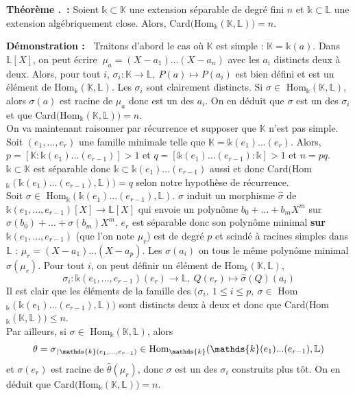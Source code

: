 \documentclass[5pt,a4paper]{article}
\newcounter{thmcounter}[subsection]
\renewcommand{\thethmcounter}{\thesubsection.\arabic{thmcounter}}
\newcommand{\thm}[1]{
    \stepcounter{thmcounter}
    \hypertarget{t:\thethmcounter}{}%
    \noindent\textbf{Théorème \thethmcounter ~:} #1 \newline
}
\newcommand{\demo}[1]{
    \textbf{Démonstration :~} #1 \newline
}
\def\restriction#1#2{\mathchoice
              {\setbox1\hbox{${\displaystyle #1}_{\scriptstyle #2}$}
              \restrictionaux{#1}{#2}}
              {\setbox1\hbox{${\textstyle #1}_{\scriptstyle #2}$}
              \restrictionaux{#1}{#2}}
              {\setbox1\hbox{${\scriptstyle #1}_{\scriptscriptstyle #2}$}
              \restrictionaux{#1}{#2}}
              {\setbox1\hbox{${\scriptscriptstyle #1}_{\scriptscriptstyle #2}$}
              \restrictionaux{#1}{#2}}}
\def\restrictionaux#1#2{{#1\,\smash{\vrule height .8\ht1 depth .85\dp1}}_{\,#2}}
\begin{document}
\begin{onehalfspacing}
\thm{Soient $\mathds{k} \subset \mathbb{K}$ une extension séparable de degré fini $n$ et $\mathds{k} \subset \mathbb{L}$ une extension algébriquement close. Alors, Card$($Hom$_{\mathds{k}}(\mathbb{K}, \mathbb{L})) = n$.}
\demo{Traitons d'abord le cas où $\mathbb{K}$ est simple : $\mathbb{K} = \mathds{k}(a)$. Dans $\mathbb{L}[X]$, on peut écrire $~\mu_a = (X - a_1)...(X - a_n)$ avec les $a_i$ distincts deux à deux. Alors, pour tout $i$, $\sigma_i : \mathbb{K} \rightarrow \mathbb{L},~P(a) \mapsto P(a_i)$ est bien défini et est un élément de Hom$_{\mathds{k}}(\mathbb{K}, \mathbb{L})$. Les $\sigma_i$ sont clairement distincts. Si $\sigma \in $ Hom$_{\mathds{k}}(\mathbb{K}, \mathbb{L})$, alors $\sigma(a)$ est racine de $\mu_a$ donc est un des $a_i$. On en déduit que $\sigma$ est un des $\sigma_i$ et que Card$($Hom$_{\mathds{k}}(\mathbb{K}, \mathbb{L})) = n$. 
\\On va maintenant raisonner par récurrence et supposer que $\mathbb{K}$ n'est pas simple. Soit $(e_1, ..., e_r)$ une famille minimale telle que $\mathbb{K} = \mathds{k}(e_1)...(e_r)$. Alors, $p = [\mathbb{K} : \mathds{k}(e_1)...(e_{r-1})] > 1$ et $q = [\mathds{k}(e_1)...(e_{r-1}) : \mathds{k}] > 1$ et $n = pq$. 
\\$\mathds{k} \subset \mathbb{K}$ est séparable donc $\mathds{k} \subset \mathds{k}(e_1)...(e_{r-1})$ aussi et donc Card$($Hom$_{\mathds{k}}(\mathds{k}(e_1)...(e_{r-1}), \mathbb{L})) = q$ selon notre hypothèse de récurrence. 
\\Soit $\sigma \in $ Hom$_{\mathds{k}}(\mathds{k}(e_1)...(e_{r-1}), \mathbb{L})$. $\sigma$ induit un morphisme $\hat{\sigma}$ de $\mathds{k}(e_1, ..., e_{r-1})[X] \rightarrow \mathbb{L}[X]$ qui envoie un polynôme $b_0 + ... + b_mX^m$ sur $\sigma(b_0) + ... + \sigma(b_m)X^m$. $e_r$ est séparable donc son polynôme minimal \textbf{sur $\mathds{k}(e_1, ..., e_{r-1})$} (que l'on note $\mu_r$) est de degré $p$ et scindé à racines simples dans $\mathbb{L}$ : $\mu_r = (X - a_1)...(X - a_p)$. Les $\sigma(a_i)$ on tous le même polynôme minimal $\hat{\sigma}(\mu_r)$. Pour tout $i$, on peut définir un élément de Hom$_{\mathds{k}}(\mathbb{K}, \mathbb{L})$,
\[ \sigma_i : \mathds{k}(e_1, ..., e_{r-1})(e_r) \rightarrow \mathbb{L},~Q(e_r) \mapsto \hat{\sigma}(Q)(a_i)\]
Il est clair que les éléments de la famille des $(\sigma_i,~1 \leq i \leq p,~\sigma \in $ Hom$_{\mathds{k}}(\mathds{k}(e_1)...(e_{r-1}), \mathbb{L}))$ sont distincts deux à deux et donc que Card$($Hom$_{\mathds{k}}(\mathbb{K}, \mathbb{L})) \leq n$. 
\\Par ailleurs, si $\sigma \in$ Hom$_{\mathds{k}}(\mathbb{K}, \mathbb{L})$, alors 
\[ \theta = \restriction{\sigma}{\mathds{k}(e_1, ..., e_{r-1})} \in \textup{Hom}_{\mathds{k}}(\mathds{k}(e_1)...(e_{r-1}), \mathbb{L}) \] 
et $\sigma(e_r)$ est racine de $\hat{\theta}(\mu_r)$, donc $\sigma$ est un des $\sigma_i$ construits plus tôt. On en déduit que Card$($Hom$_{\mathds{k}}(\mathbb{K}, \mathbb{L})) = n$.}



\end{onehalfspacing}
\end{document}
